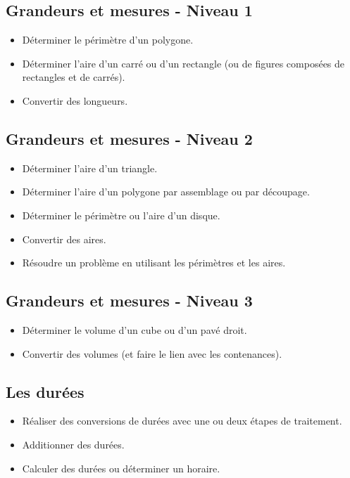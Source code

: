 \documentclass[a4paper,12pt,fleqn]{article}
\begin{document}
\renewcommand{\labelitemi}{}

\subsection*{Grandeurs et mesures - Niveau 1}

\begin{itemize}
	\item {}Déterminer le périmètre d’un polygone.
	\item {}Déterminer l’aire d’un carré ou d’un rectangle (ou de figures composées de rectangles et de carrés).
	\item {}Convertir des longueurs.
\end{itemize}

\subsection*{Grandeurs et mesures - Niveau 2}

\begin{itemize}
	\item {}Déterminer l’aire d’un triangle. %
	\item {}Déterminer l’aire d’un polygone par assemblage ou par découpage.
	\item {}Déterminer le périmètre ou l’aire d’un disque.
	\item {}Convertir des aires.
	\item {}Résoudre un problème en utilisant les périmètres et les aires.

\end{itemize}

\subsection*{Grandeurs et mesures - Niveau 3}

\begin{itemize}
	\item {}Déterminer le volume d’un cube ou d'un pavé droit.
	\item {}Convertir des volumes (et faire le lien avec les contenances). %
\end{itemize}

\subsection*{Les durées}

\begin{itemize}
	\item {}Réaliser des conversions de durées avec une ou deux étapes de traitement. %
	\item {}Additionner des durées.
	\item {}Calculer des durées ou déterminer un horaire.
\end{itemize}
\end{document}
